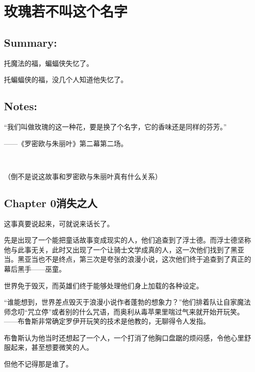 \documentclass[../main.tex]{subfiles}
\begin{document}
\pagestyle{mystyle}

\chapter{玫瑰若不叫这个名字}

\vspace{3cm}

\section*{Summary:}

托魔法的福，蝙蝠侠失忆了。

托蝙蝠侠的福，没几个人知道他失忆了。

\vspace{3em}

\section*{Notes:}

“我们叫做玫瑰的这一种花，要是换了个名字，它的香味还是同样的芬芳。”

\hfill——《罗密欧与朱丽叶》第二幕第二场。

~\

（倒不是说这故事和罗密欧与朱丽叶真有什么关系）

\newpage

\section*{Chapter 0\hspace{1em}消失之人}

这事真要说起来，可就说来话长了。

先是出现了一个能把童话故事变成现实的人，他们追查到了浮士德。而浮士德坚称他与此事无关，此时又出现了一个让骑士文学成真的人，这一次他们找到了黑亚当。黑亚当也不是终点，第三次是夸张的浪漫小说，这次他们终于追查到了真正的幕后黑手——巫童。

世界免于毁灭，而英雄们终于能够处理他们身上加载的各种设定。

“谁能想到，世界差点毁灭于浪漫小说作者蓬勃的想象力？”他们排着队让自家魔法师念叨“咒立停”或者别的什么咒语，而奥利从毒苹果里喘过气来就开始开玩笑。——布鲁斯非常确定罗伊开玩笑的技术是他教的，无聊得令人发指。

布鲁斯认为他当时还想起了一个人，一个打消了他胸口盘踞的烦闷感，令他心里舒服起来，甚至想要微笑的人。

但他不记得那是谁了。
\end{document}
